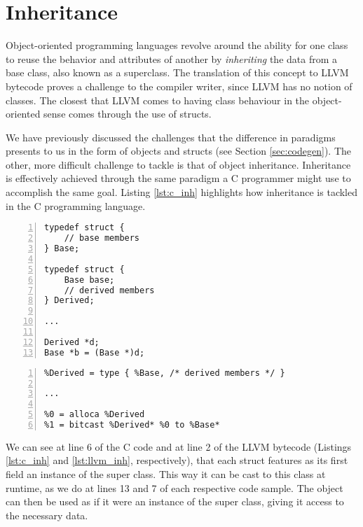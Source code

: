 \newpage

\section{Inheritance}
\label{sec:inheritance}

Object-oriented programming languages revolve around the ability for one class to reuse the behavior and attributes of another by \textit{inheriting} the data from a base class, also known as a superclass. The translation of this concept to LLVM bytecode proves a challenge to the compiler writer, since LLVM has no notion of classes. The closest that LLVM comes to having class behaviour  in the object-oriented sense comes through the use of structs.

We have previously discussed the challenges that the difference in paradigms presents to us in the form of objects and structs (see Section \ref{sec:codegen}). The other, more difficult challenge to tackle is that of object inheritance. Inheritance is effectively achieved through the same paradigm a C programmer might use to accomplish the same goal. Listing \ref{lst:c_inh} highlights how inheritance is tackled in the C programming language.

\newpage

\lstset{
	language=C,
	basicstyle=\small,
	stringstyle=\ttfamily
}

\begin{lstlisting}[frame=single, numbers=left, numberstyle=\tiny, caption={C Inheritance}, label=lst:c_inh]
typedef struct {
    // base members
} Base;

typedef struct {
    Base base;  
    // derived members   
} Derived;

...

Derived *d;
Base *b = (Base *)d;
\end{lstlisting}


\begin{lstlisting}[frame=single, numbers=left, numberstyle=\tiny, caption={LLVM IR Inheritance}, label=lst:llvm_inh]
%Base = type { /* base members */ }
%Derived = type { %Base, /* derived members */ }

...

%0 = alloca %Derived
%1 = bitcast %Derived* %0 to %Base*
\end{lstlisting}

We can see at line 6 of the C code and at line 2 of the LLVM bytecode (Listings \ref{lst:c_inh} and \ref{lst:llvm_inh}, respectively), that each struct features as its first field an instance of the super class. This way it can be cast to this class at runtime, as we do at lines 13 and 7 of each respective code sample. The object can then be used as if it were an instance of the super class, giving it access to the necessary data.

